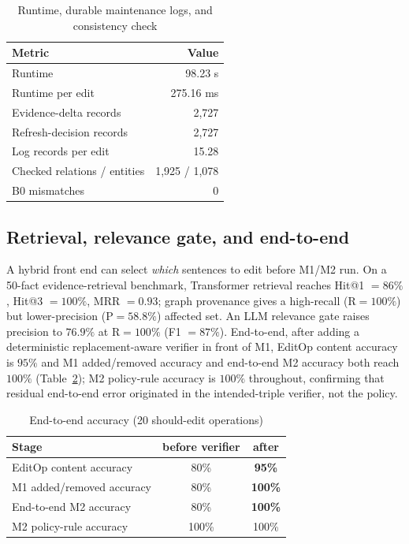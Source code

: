 \documentclass[conference]{IEEEtran}
\begin{document}
\begin{table}[t]
\caption{Runtime, durable maintenance logs, and consistency check}
\label{tab:runtime}
\centering
\footnotesize
\setlength{\tabcolsep}{4pt}
\begin{tabular}{lr}
\toprule
\textbf{Metric} & \textbf{Value}\\
\midrule
Runtime & 98.23 s\\
Runtime per edit & 275.16 ms\\
Evidence-delta records & 2{,}727\\
Refresh-decision records & 2{,}727\\
Log records per edit & 15.28\\
Checked relations / entities & 1{,}925 / 1{,}078\\
B0 mismatches & 0\\
\bottomrule
\end{tabular}
\end{table}

\subsection{Retrieval, relevance gate, and end-to-end}
A hybrid front end can select \emph{which} sentences to edit before M1/M2 run.
On a 50-fact evidence-retrieval benchmark, Transformer retrieval reaches
Hit@1 $=86\%$, Hit@3 $=100\%$, MRR $=0.93$; graph provenance gives a high-recall
(R$=100\%$) but lower-precision (P$=58.8\%$) affected set. An LLM relevance gate
raises precision to $76.9\%$ at R$=100\%$ (F1 $=87\%$). End-to-end, after adding a
deterministic replacement-aware verifier in front of M1, EditOp content accuracy
is $95\%$ and M1 added/removed accuracy and end-to-end M2 accuracy both reach
$100\%$ (Table~\ref{tab:e2e}); M2 policy-rule accuracy is $100\%$ throughout,
confirming that residual end-to-end error originated in the intended-triple
verifier, not the policy.

\begin{table}[t]
\caption{End-to-end accuracy (20 should-edit operations)}
\label{tab:e2e}
\centering
\footnotesize
\begin{tabular}{lcc}
\toprule
\textbf{Stage} & \textbf{before verifier} & \textbf{after}\\
\midrule
EditOp content accuracy & 80\% & \textbf{95\%}\\
M1 added/removed accuracy & 80\% & \textbf{100\%}\\
End-to-end M2 accuracy & 80\% & \textbf{100\%}\\
M2 policy-rule accuracy & 100\% & 100\%\\
\bottomrule
\end{tabular}
\end{table}
\end{document}
